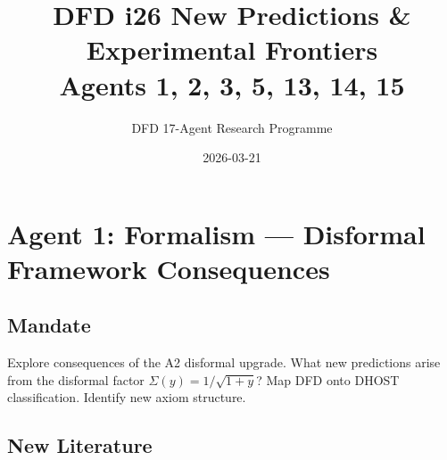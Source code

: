 \documentclass[11pt,a4paper]{article}
\title{DFD i26 New Predictions \& Experimental Frontiers\\Agents 1, 2, 3, 5, 13, 14, 15}
\author{DFD 17-Agent Research Programme}
\date{2026-03-21}
\begin{document}
\maketitle
\tableofcontents
\newpage

\section{Agent 1: Formalism --- Disformal Framework Consequences}

\subsection{Mandate}
Explore consequences of the A2 disformal upgrade. What new predictions arise from the disformal factor $\Sigma(y) = 1/\sqrt{1+y}$? Map DFD onto DHOST classification. Identify new axiom structure.

\subsection{New Literature}
\end{document}
